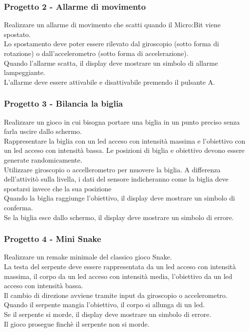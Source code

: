 \documentclass{beamer}
\begin{document}
\begin{frame}
	\frametitle{Progetto 2 - Allarme di movimento}

	Realizzare un allarme di movimento che scatti quando il Micro:Bit viene spostato.\\
	Lo spostamento deve poter essere rilevato dal giroscopio (sotto forma di rotazione) o dall'accelerometro (sotto forma di accelerazione).\\
	Quando l'allarme scatta, il display deve mostrare un simbolo di allarme lampeggiante.\\
	L'allarme deve essere attivabile e disattivabile premendo il pulsante A.\\

\end{frame}

\begin{frame}
	\frametitle{Progetto 3 - Bilancia la biglia}

	Realizzare un gioco in cui bisogna portare una biglia in un punto preciso senza farla uscire dallo schermo.\\
	Rappresentare la biglia con un led acceso con intensità massima e l'obiettivo con un led acceso con intensità bassa. Le posizioni di biglia e obiettivo devono essere generate randomicamente.\\
	Utilizzare giroscopio o accellerometro per muovere la biglia. A differenza dell'attivitò sulla livella, i dati del sensore indicheranno come la biglia deve spostarsi invece che la sua posizione\\
	Quando la biglia raggiunge l'obiettivo, il display deve mostrare un simbolo di conferma.\\
	Se la biglia esce dallo schermo, il display deve mostrare un simbolo di errore.	

\end{frame}

\begin{frame}
	\frametitle{Progetto 4 - Mini Snake}

	Realizzare un remake minimale del classico gioco Snake.\\
	La testa del serpente deve essere rappresentata da un led acceso con intensità massima, il corpo da un led acceso con intensità media, l'obiettivo da un led acceso con intensità bassa.\\
	Il cambio di direzione avviene tramite input da giroscopio o accelerometro.\\
	Quando il serpente mangia l'obiettivo, il corpo si allunga di un led.\\
	Se il serpente si morde, il display deve mostrare un simbolo di errore.\\
	Il gioco prosegue finchè il serpente non si morde.

\end{frame}
\end{document}
